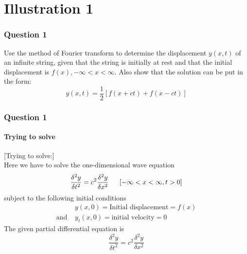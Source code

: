 \documentclass[9 pt]{beamer}
\begin{document}
\section{Illustration 1}


\begin{frame}[fragile]
	\frametitle{Question 1}
	\begin{block}{1}
		Use the method of Fourier transform to determine the displacement $y(x, t)$ of an infinite string, given that the string is initially at rest and that the initial displacement is $f(x), -\infty < x < \infty$. Also show that the solution can be put in the form:
		\begin{displaymath}
			y(x, t)=\frac{1}{2}\left[f(x+ct)+f(x-ct)\right]
		\end{displaymath}
	\end{block}
	\transwipe[duration=0.6]
\end{frame}


\begin{frame}[fragile]
	\frametitle{Question 1}
	\framesubtitle{Trying to solve}
	[Trying to solve:]  \\
	Here we have to solve the one-dimensional wave equation
	$$\frac{\delta^2y}{\delta t^2}=c^2\frac{\delta^2y}{\delta x^2} \hspace{0.5cm}\left[-\infty < x < \infty, t>0\right]$$
	subject to the following initial conditions
	\begin{align*}
		              & y(x,0)=\textrm{Initial displacement}=f(x) \\
		\textrm{and } & y_t(x,0)=\textrm{initial velocity}=0
	\end{align*}
	The given partial differential equation is
	\begin{equation}
		\frac{\delta^2y}{\delta t^2}=c^2\frac{\delta^2y}{\delta x^2}
	\end{equation}
	\transfade[duration=0.6]
\end{frame}
\end{document}
